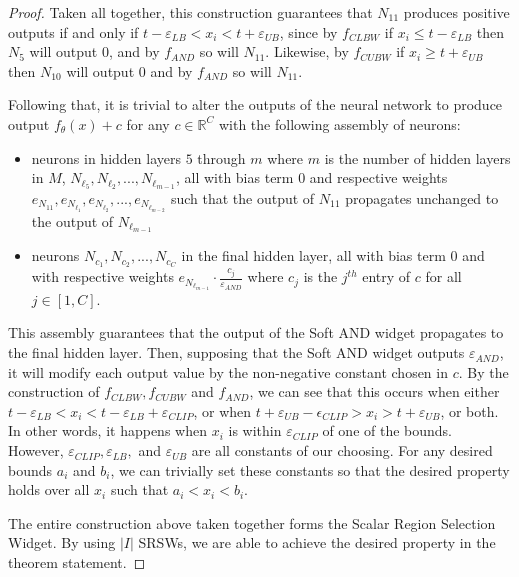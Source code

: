 \begin{proof}
Taken all together, this construction guarantees that $N_{11}$ produces positive outputs if and only if $t-\varepsilon_{LB}<x_i<t+\varepsilon_{UB}$, since by $f_{CLBW}$ if $x_i \leq t-\varepsilon_{LB}$ then $N_5$ will output $0$, and by $f_{AND}$ so will $N_{11}$. Likewise, by $f_{CUBW}$ if $x_i \geq t+\varepsilon_{UB}$ then $N_{10}$ will output $0$ and by $f_{AND}$ so will $N_{11}$. 

Following that, it is trivial to alter the outputs of the neural network to produce output $f_{\theta}(x)+c$ for any $c \in \mathbb{R}^C$ with the following assembly of neurons:
\begin{itemize}
    \item neurons in hidden layers $5$ through $m$ where $m$ is the number of hidden layers in $M$, $N_{\ell_5}, N_{\ell_2}, ..., N_{\ell_{m-1}}$, all with bias term $0$ and respective weights $e_{N_11}, e_{N_{\ell_1}}, e_{N_{\ell_2}}, ..., e_{N_{\ell_{m-2}}}$ such that the output of $N_{11}$ propagates unchanged to the output of $N_{\ell_{m-1}}$
    \item neurons $N_{c_1}, N_{c_2}, ..., N_{c_C}$ in the final hidden layer, all with bias term $0$ and with respective weights $e_{N_{\ell_{m-1}}} \cdot \frac{c_j}{\varepsilon_{AND}}$ where $c_j$ is the $j^{th}$ entry of $c$ for all $j \in [1,C]$.
\end{itemize}

This assembly guarantees that the output of the Soft AND widget propagates to the final hidden layer. Then, supposing that the Soft AND widget outputs $\varepsilon_{AND}$, it will modify each output value by the non-negative constant chosen in $c$. By the construction of $f_{CLBW}, f_{CUBW}$ and $f_{AND}$, we can see that this occurs when either $t-\varepsilon_{LB} < x_i < t - \varepsilon_{LB} + \varepsilon_{CLIP}$, or when $t+\varepsilon_{UB}-\epsilon_{CLIP} > x_i > t + \varepsilon_{UB}$, or both. In other words, it happens when $x_i$ is within $\varepsilon_{CLIP}$ of one of the bounds. However, $\varepsilon_{CLIP}, \varepsilon_{LB},$ and $\varepsilon_{UB}$ are all constants of our choosing. For any desired bounds $a_i$ and $b_i$, we can trivially set these constants so that the desired property holds over all $x_i$ such that $a_i < x_i < b_i$.

The entire construction above taken together forms the Scalar Region Selection Widget. By using $|I|$ SRSWs, we are able to achieve the desired property in the theorem statement.
\end{proof}


